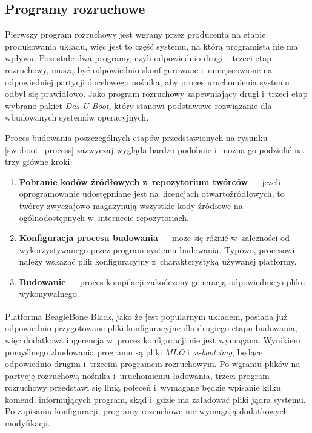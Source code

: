 \subsection{Programy rozruchowe}

Pierwszy program rozruchowy jest wgrany przez producenta na etapie produkowania
układu, więc jest to część systemu, na którą programista nie ma wpływu.
Pozostałe dwa programy, czyli odpowiednio drugi i~trzeci etap rozruchowy, muszą
być odpowiednio skonfigurowane i~umiejscowione na odpowiedniej partycji
docelowego nośnika, aby proces uruchomienia systemu odbył się prawidłowo. Jako
program rozruchowy zapewniający drugi i~trzeci etap wybrano pakiet \textit{Das
U-Boot}, który stanowi podstawowe rozwiązanie dla wbudowanych systemów
operacyjnych. \par Proces budowania poszczególnych etapów przedstawionych na
rysunku \ref{sw::boot_process} zazwyczaj wygląda bardzo podobnie i~można go
podzielić na trzy główne kroki:

\begin{enumerate}

    \item \textbf{Pobranie kodów źródłowych z~repozytorium twórców} --- jeżeli
    oprogramowanie udostępniane jest na~licencjach otwartoźródłowych, to twórcy
    zwyczajowo magazynują wszystkie kody źródłowe na ogólnodostępnych
    w~internecie repozytoriach.

    \item \textbf{Konfiguracja procesu budowania} --- może się różnić
    w~zależności od wykorzystywanego przez program systemu budowania. Typowo,
    procesowi należy wskazać plik konfiguracyjny z~charakterystyką używanej
    platformy.

    \item \textbf{Budowanie} --- proces kompilacji zakończony generacją
    odpowiedniego pliku wykonywalnego.

\end{enumerate}

Platforma BeagleBone Black\textsuperscript{\textregistered}, jako że jest
popularnym układem, posiada już odpowiednio przygotowane pliki konfiguracyjne
dla drugiego etapu budowania, więc dodatkowa ingerencja w~proces konfiguracji
nie jest wymagana. Wynikiem pomyślnego zbudowania programu są pliki \textit{MLO}
i~\textit{u-boot.img}, będące odpowiednio drugim i~trzecim programem
rozruchowym. Po wgraniu plików na partycję rozruchową nośnika i~uruchomieniu
ładowania, trzeci program rozruchowy przedstawi się linią poleceń i~wymagane
będzie wpisanie kilku komend, informujących program, skąd i~gdzie ma załadować
pliki jądra systemu. Po zapisaniu konfiguracji, programy rozruchowe nie wymagają
dodatkowych modyfikacji.

